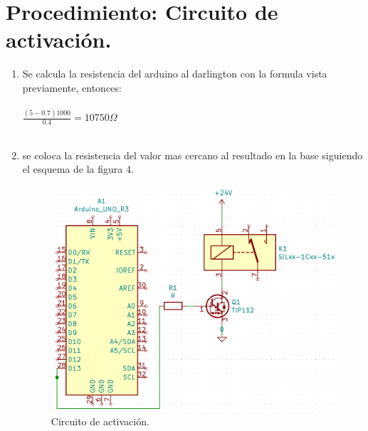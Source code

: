\documentclass[letterpaper]{article}
\begin{document}
\section{Procedimiento: Circuito de activación.}
\begin{large}
    \begin{enumerate}
        \item Se calcula la resistencia del arduino al darlington con la formula vista previamente, entonces:\\\\
        $\frac{(5-0.7)1000}{0.4}=10750\Omega$\\\\
        \item se coloca la resistencia del valor mas cercano al resultado en la base siguiendo el esquema de la figura 4.
        \begin{figure}[htbp]
            \centering
            \includegraphics[scale=0.4]{IMG/ciract.png}
            \caption{Circuito de activación.}
        \end{figure}
    \end{enumerate}
\end{large}
\end{document}
